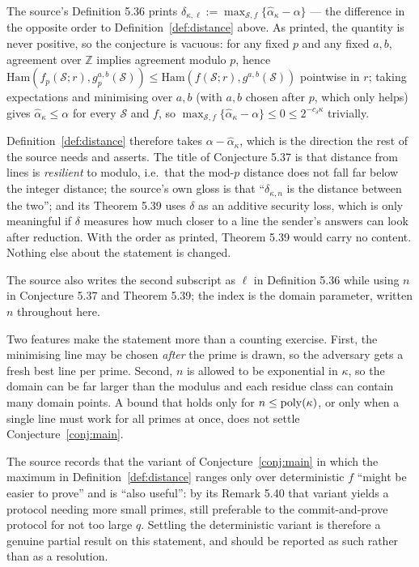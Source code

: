 \documentclass{aicr-conjecture}
\newcommand{\Ham}{\mathrm{Ham}}
\newcommand{\Sc}{\mathcal{S}}
\begin{document}
\begin{remark}\label{rem:sign}
The source's Definition 5.36 prints $\delta_{\kappa,\ell} :=
\max_{\Sc,f}\{\widehat{\alpha}_{\kappa} - \alpha\}$ --- the difference in
the opposite order to Definition~\ref{def:distance} above. As printed,
the quantity is never positive, so the conjecture is vacuous: for any
fixed $p$ and any fixed $a,b$, agreement over $\mathbb{Z}$ implies
agreement modulo $p$, hence $\Ham(f_{p}(\Sc;r), g^{a,b}_{p}(\Sc)) \le
\Ham(f(\Sc;r), g^{a,b}(\Sc))$ pointwise in $r$; taking expectations and
minimising over $a, b$ (with $a,b$ chosen after $p$, which only helps)
gives $\widehat{\alpha}_{\kappa} \le \alpha$ for every $\Sc$ and $f$, so
$\max_{\Sc,f}\{\widehat{\alpha}_{\kappa} - \alpha\} \le 0 \le
2^{-c_{\delta}\kappa}$ trivially.

Definition~\ref{def:distance} therefore takes $\alpha -
\widehat{\alpha}_{\kappa}$, which is the direction the rest of the source
needs and asserts. The title of Conjecture 5.37 is that distance from
lines is \emph{resilient} to modulo, i.e.\ that the mod-$p$ distance does
not fall far below the integer distance; the source's own gloss is that
``$\delta_{\kappa,n}$ is the distance between the two''; and its
Theorem 5.39 uses $\delta$ as an additive security loss, which is only
meaningful if $\delta$ measures how much closer to a line the sender's
answers can look after reduction. With the order as printed, Theorem 5.39
would carry no content. Nothing else about the statement is changed.

The source also writes the second subscript as $\ell$ in
Definition 5.36 while using $n$ in Conjecture 5.37 and Theorem 5.39; the
index is the domain parameter, written $n$ throughout here.
\end{remark}

\begin{remark}
Two features make the statement more than a counting exercise. First, the
minimising line may be chosen \emph{after} the prime is drawn, so the
adversary gets a fresh best line per prime. Second, $n$ is allowed to be
exponential in $\kappa$, so the domain can be far larger than the
modulus and each residue class can contain many domain points. A bound
that holds only for $n \le \mathrm{poly}(\kappa)$, or only when a single line
must work for all primes at once, does not settle
Conjecture~\ref{conj:main}.
\end{remark}

\begin{remark}
The source records that the variant of Conjecture~\ref{conj:main} in
which the maximum in Definition~\ref{def:distance} ranges only over
deterministic $f$ ``might be easier to prove'' and is ``also useful'':
by its Remark 5.40 that variant yields a protocol needing more small
primes, still preferable to the commit-and-prove protocol for not too
large $q$. Settling the deterministic variant is therefore a genuine
partial result on this statement, and should be reported as such rather
than as a resolution.
\end{remark}
\end{document}
